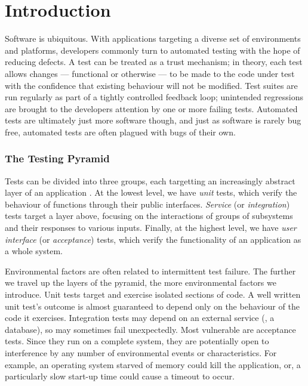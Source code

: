\section{Introduction}
\label{sec:intro}

Software is ubiquitous. With applications targeting a diverse set of
environments and platforms, developers commonly turn to automated testing with
the hope of reducing defects. A test can be treated as a trust mechanism; in
theory, each test allows changes --- functional or otherwise --- to be made to
the code under test with the confidence that existing behaviour will not be
modified. Test suites are run regularly as part of a tightly controlled feedback
loop; unintended regressions are brought to the developers attention by one or
more failing tests. Automated tests are ultimately just more software though,
and just as software is rarely bug free, automated tests are often plagued with
bugs of their own.

\subsubsection{The Testing Pyramid}
\label{sec:sec:sec:the_testing_pyramid}

Tests can be divided into three groups, each targetting an increasingly abstract
layer of an application \citep[see][Chapter~16]{cohn2009succeeding}. At the
lowest level, we have \emph{unit} tests, which verify the behaviour of functions
through their public interfaces. \emph{Service} (or \emph{integration}) tests
target a layer above, focusing on the interactions of groups of subsystems and
their responses to various inputs. Finally, at the highest level, we have
\emph{user interface} (or \emph{acceptance}) tests, which verify the
functionality of an application as a whole system.

Environmental factors are often related to intermittent test failure. The
further we travel up the layers of the pyramid, the more environmental factors
we introduce. Unit tests target and exercise isolated sections of code. A well
written unit test's outcome is almost guaranteed to depend only on the behaviour
of the code it exercises. Integration tests may depend on an external service
(\eg, a database), so may sometimes fail unexpectedly. Most vulnerable are
acceptance tests. Since they run on a complete system, they are potentially open
to interference by any number of environmental events or characteristics. For
example, an operating system starved of memory could kill the application, or, a
particularly slow start-up time could cause a timeout to occur.

